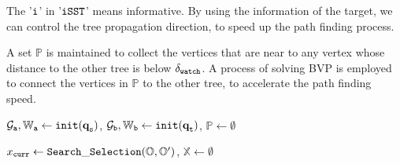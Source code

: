 \documentclass[conference, onecolumn]{IEEEtran}
\begin{document}
The '$\tt i$' in '$\tt iSST$' means informative. By using the information of the target, we can control the tree propagation direction, to speed up the path finding process.

A set $\mathbb{P}$ is maintained to collect the vertices that are near to any vertex whose distance to the other tree is below $\delta_{\tt watch}$. A process of solving BVP is employed to connect the vertices in $\mathbb{P}$ to the other tree, to accelerate the path finding speed. 

\begin{algorithm}[ht!]
	\caption {${{\tt Bi}}$-${{\tt iSST}}$}
	\label{biisst}
	\DontPrintSemicolon
	\SetAlgoVlined
	\BlankLine
	
	$\mathcal{G}_{\tt a},\mathbb{W}_{\tt a} \gets \mathtt{init}(\textbf{q}_{\tt s})$, $\mathcal{G}_{\tt b},\mathbb{W}_{\tt b} \gets \mathtt{init}(\textbf{q}_{\tt t})$, $\mathbb{P} \gets \emptyset$\;
	

	
\end{algorithm}



\begin{algorithm}[ht!]
	\caption {${\tt iSST\_Propagation}$}
	\label{isst_step}
	\DontPrintSemicolon
	\SetAlgoVlined
	\BlankLine	
	
	$x_{\tt curr} \gets \mathtt{Search\_Selection}(\mathbb{O},\mathbb{O'})$, $\mathbb{X} \gets \emptyset$\;		
\end{algorithm}
\end{document}
